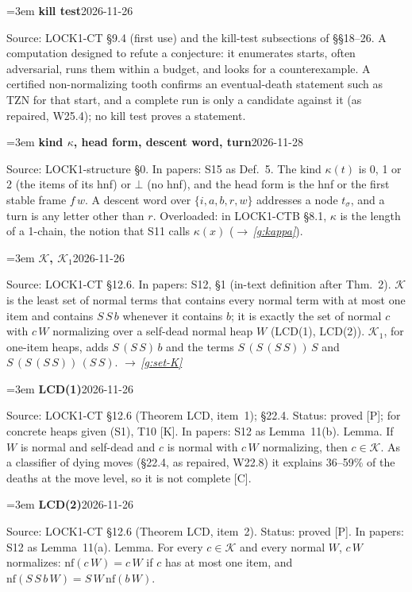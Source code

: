 \documentclass[11pt]{amsart}
\makeatletter
\newcommand{\nf}{\mathrm{nf}}
\newcommand{\Kc}{\mathcal K}
\newcounter{sense}
\newenvironment{entry}[3]{%
  \par\addvspace{\medskipamount}\noindent\phantomsection
  \def\@currentlabel{#2}\label{#1}\setcounter{sense}{0}\raggedright\emergencystretch=3em%
  \textbf{#2}\hfill{\footnotesize\textsf{#3}}\par\nopagebreak\noindent\ignorespaces}%
  {\par}
\newcommand{\src}[1]{\textsf{Source:} #1.\enskip}
\newcommand{\status}[1]{\textsf{Status:} #1.\enskip}
\newcommand{\appears}[1]{\textsf{In papers:} #1.\enskip}
\renewcommand{\see}[1]{$\rightarrow$\,\emph{\ref{#1}}}
\makeatother
\begin{document}
\begin{entry}{g:wl-kill-test}{kill test}{2026-11-26}
\src{LOCK1-CT \S9.4 (first use) and the kill-test subsections of \S\S18--26}
A computation designed to refute a conjecture: it enumerates starts, often adversarial, runs them
within a budget, and looks for a counterexample. A certified non-normalizing tooth confirms an
eventual-death statement such as TZN for that start, and a complete run is only a candidate against
it (as repaired, W25.4); no kill test proves a statement.
\end{entry}

\begin{entry}{g:wl-kind}{kind $\kappa$, head form, descent word, turn}{2026-11-28}
\src{LOCK1-structure \S0}
\appears{S15 as Def.~5}
The kind $\kappa(t)$ is 0, 1 or 2 (the items of its hnf) or $\bot$ (no hnf), and the head form is the
hnf or the first stable frame $f\,w$. A descent word over $\{i,a,b,r,w\}$ addresses a node $t_\sigma$,
and a turn is any letter other than $r$. Overloaded: in LOCK1-CTB \S8.1, $\kappa$ is the length of a
1-chain, the notion that S11 calls $\kappa(x)$ (\see{g:kappa}).
\end{entry}

\begin{entry}{g:wl-calK}{$\Kc$, $\Kc_1$}{2026-11-26}
\src{LOCK1-CT \S12.6}
\appears{S12, \S1 (in-text definition after Thm.~2)}
$\Kc$ is the least set of normal terms that contains every normal term with at most one item and
contains $S\,S\,b$ whenever it contains $b$; it is exactly the set of normal $c$ with $c\,W$
normalizing over a self-dead normal heap $W$ (LCD(1), LCD(2)). $\Kc_1$, for one-item heaps, adds
$S\,(S\,S)\,b$ and the terms $S\,(S\,(S\,S))\,S$ and $S\,(S\,(S\,S))\,(S\,S)$. \see{g:set-K}
\end{entry}

\begin{entry}{g:wl-lcd1}{LCD(1)}{2026-11-26}
\src{LOCK1-CT \S12.6 (Theorem LCD, item~1); \S22.4}
\status{proved [P]; for concrete heaps given (S1), T10 [K]}
\appears{S12 as Lemma~11(b)}
Lemma. If $W$ is normal and self-dead and $c$ is normal with $c\,W$ normalizing, then $c\in\Kc$. As a
classifier of dying moves (\S22.4, as repaired, W22.8) it explains 36--59\% of the deaths at the move
level, so it is not complete [C].
\end{entry}

\begin{entry}{g:wl-lcd2}{LCD(2)}{2026-11-26}
\src{LOCK1-CT \S12.6 (Theorem LCD, item~2)}
\status{proved [P]}
\appears{S12 as Lemma~11(a)}
Lemma. For every $c\in\Kc$ and every normal $W$, $c\,W$ normalizes: $\nf(c\,W)=c\,W$ if $c$ has at
most one item, and $\nf(S\,S\,b\,W)=S\,W\,\nf(b\,W)$.
\end{entry}
\end{document}
